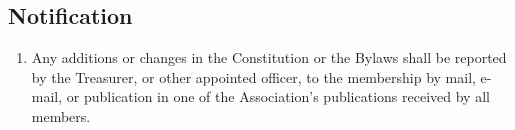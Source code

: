 \subsection{Notification}
\begin{enumerate}
	\item Any additions or changes in the Constitution or the Bylaws shall be reported by the Treasurer, or other appointed officer, to the membership by mail, e-mail, or publication in one of the Association's publications received by all members.
\end{enumerate}


